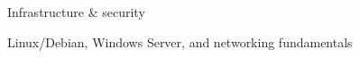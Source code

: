 \begin{cventries}
  \zcventry
    {Infrastructure \& security} %
    {
      \begin{cvitems} %
        \item {Linux/Debian, Windows Server, and networking fundamentals}
      \end{cvitems}
    }

\end{cventries}
